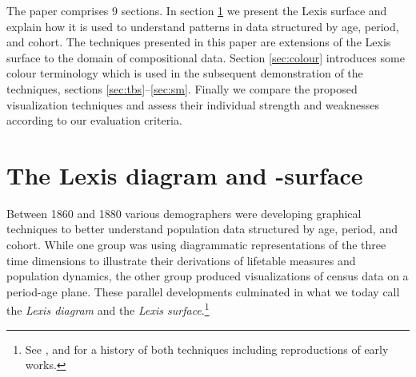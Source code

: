 \documentclass[parskip=half]{scrartcl}
\begin{document}
The paper comprises 9 sections. In section \ref{sec:lexis} we present the Lexis surface and explain how it is used to understand patterns in data structured by age, period, and cohort. The techniques presented in this paper are extensions of the Lexis surface to the domain of compositional data. Section \ref{sec:colour} introduces some colour terminology which is used in the subsequent demonstration of the techniques, sections \ref{sec:tbs}--\ref{sec:sm}. Finally we compare the proposed visualization techniques and assess their individual strength and weaknesses according to our evaluation criteria.

\clearpage

\section{The Lexis diagram and -surface} %
\label{sec:lexis}

Between 1860 and 1880 various demographers were developing graphical techniques to better understand population data structured by age, period, and cohort. While one group was using diagrammatic representations of the three time dimensions to illustrate their derivations of lifetable measures and population dynamics, the other group produced visualizations of census data on a period-age plane. These parallel developments culminated in what we today call the \emph{Lexis diagram} and the \emph{Lexis surface}.\footnote{
  See \textcite{Caselli1990}, \textcite{Vandeschrick2001} and \textcite{Keiding2011} for a history of both techniques including reproductions of early works.
}
\end{document}
